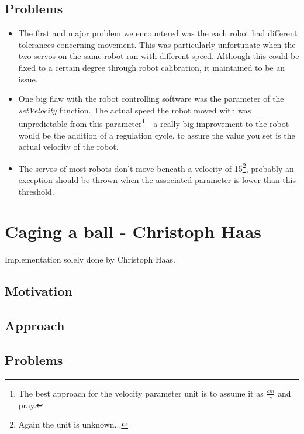 \documentclass[703031]{iisreport}
\begin{document}
\subsection{Problems}
\label{subsec:motion_problems}
	\begin{itemize}
		\item 	The first and major problem we encountered was the each robot had different tolerances concerning movement. This was particularly unfortunate when the two servos on 
			the same robot ran with different speed. Although this could be fixed to a certain degree through robot calibration, it maintained to be an issue.
		\item	One big flaw with the robot controlling software was the parameter of the \emph{setVelocity} function. The actual speed the robot moved with was unpredictable from
			this parameter\footnote{The best approach for the velocity parameter unit is to assume it as $\frac{cm}{s}$ and pray.} - a really big improvement to the robot would be the
			addition of a regulation cycle, to assure the value you set is the actual velocity of the robot.
		\item 	The servos of most robots don't move beneath a velocity of 15\footnote{Again the unit is unknown...}, probably an exception should be thrown when the associated 			parameter is lower than this threshold.
	\end{itemize}


\section{Caging a ball - Christoph Haas}
\label{sec:caging}
Implementation solely done by Christoph Haas.

\subsection{Motivation}

\subsection{Approach}

\subsection{Problems}
\end{document}
